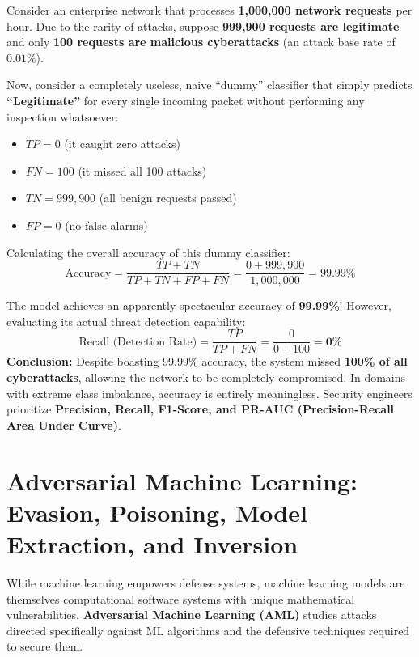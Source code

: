 \begin{tcolorbox}[colback=red!5!white,colframe=red!60!black,title=\textbf{The Mathematical Proof: The Base Rate Fallacy in Cybersecurity}]
Consider an enterprise network that processes \textbf{1,000,000 network requests} per hour. 
Due to the rarity of attacks, suppose \textbf{999,900 requests are legitimate} and only \textbf{100 requests are malicious cyberattacks} (an attack base rate of $0.01\%$).

Now, consider a completely useless, naive ``dummy'' classifier that simply predicts \textbf{``Legitimate''} for every single incoming packet without performing any inspection whatsoever:
\begin{itemize}
\item $TP = 0$ (it caught zero attacks)
\item $FN = 100$ (it missed all 100 attacks)
\item $TN = 999,900$ (all benign requests passed)
\item $FP = 0$ (no false alarms)
\end{itemize}

Calculating the overall accuracy of this dummy classifier:
\[ \text{Accuracy} = \frac{TP + TN}{TP + TN + FP + FN} = \frac{0 + 999,900}{1,000,000} = \mathbf{99.99\%} \]

The model achieves an apparently spectacular accuracy of \textbf{99.99\%}! However, evaluating its actual threat detection capability:
\[ \text{Recall (Detection Rate)} = \frac{TP}{TP + FN} = \frac{0}{0 + 100} = \mathbf{0\%} \]
\textbf{Conclusion:} Despite boasting 99.99\% accuracy, the system missed \textbf{100\% of all cyberattacks}, allowing the network to be completely compromised. In domains with extreme class imbalance, accuracy is entirely meaningless. Security engineers prioritize \textbf{Precision, Recall, F1-Score, and PR-AUC (Precision-Recall Area Under Curve)}.
\end{tcolorbox}

\newpage
\section{Adversarial Machine Learning: Evasion, Poisoning, Model Extraction, and Inversion}

While machine learning empowers defense systems, machine learning models are themselves computational software systems with unique mathematical vulnerabilities. \textbf{Adversarial Machine Learning (AML)} studies attacks directed specifically against ML algorithms and the defensive techniques required to secure them.

